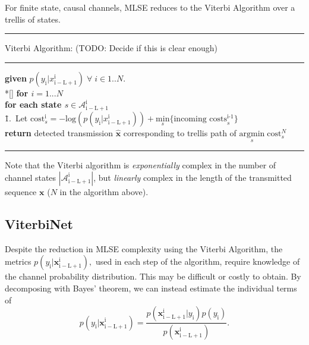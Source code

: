 \documentclass[12pt,a4paper]{report}
\begin{document}
For finite state, causal channels, MLSE reduces to the Viterbi Algorithm over a trellis of states.
\\

    \noindent\rule[16pt]{\textwidth}{0.6pt}
	Viterbi Algorithm: (TODO: Decide if this is clear enough)

    \noindent\rule[10pt]{\textwidth}{0.4pt}
    {\footnotesize
    \begin{tabbing}
        {\bf given} $p(y_{\mathrm{i}}|x_{\mathrm{i-L+1}}^{\mathrm{i}}) \; \forall  \;i \in {1..N}$. \\*[\smallskipamount]
        {\bf for $i = 1...N $} \\
         \qquad \= {\bf for each state $s \in \mathcal{A}_{\mathrm{i-L+1}}^{\mathrm{i}}$}\\
        \qquad \qquad \= 1.\ Let $\text{cost}_{s}^{\text{i}} = -\text{log}(p(y_{\mathrm{i}}|x_{\mathrm{i-L+1}}^{\mathrm{i}})) + \underset{s}{\text{min}} \{\text{incoming costs}_{s}^{\text{i-1}}\}$ \\
        {\bf return} detected transmission $\hat{\mathbf{x}}$ corresponding to trellis path of $\underset{s}{\text{argmin}} \; \text{cost}_{s}^N $
    \end{tabbing}}
    \noindent\rule[10pt]{\textwidth}{0.4pt}


Note that the Viterbi algorithm is \emph{exponentially} complex in the number of channel states $|\mathcal{A}_{\mathrm{i-L+1}}^{\mathrm{i}}|$, but \emph{linearly} complex in the length of the transmitted sequence $\mathbf{x}$ ($N$ in the algorithm above). 


\subsection{ViterbiNet}
Despite the reduction in MLSE complexity using the Viterbi Algorithm, the metrics $p(y_{\mathrm{i}}|\mathbf{x}_{\mathrm{i-L+1}}^{\mathrm{i}}) ,$ used in each step of the algorithm,
 require knowledge of the channel probability distribution. This may be difficult or costly to obtain. By decomposing with Bayes' theorem, we can instead estimate the individual terms of
\begin{equation*}
p(y_{\mathrm{i}}|\mathbf{x}_{\mathrm{i-L+1}}^{\mathrm{i}}) = 
\frac
{p(\mathbf{x}_{\mathrm{i-L+1}}^{\mathrm{i}}|y_{\mathrm{i}})p(y_{\mathrm{i}})}
{p(\mathbf{x}_{\mathrm{i-L+1}}^{\mathrm{i}})}.
\end{equation*}
\end{document}
